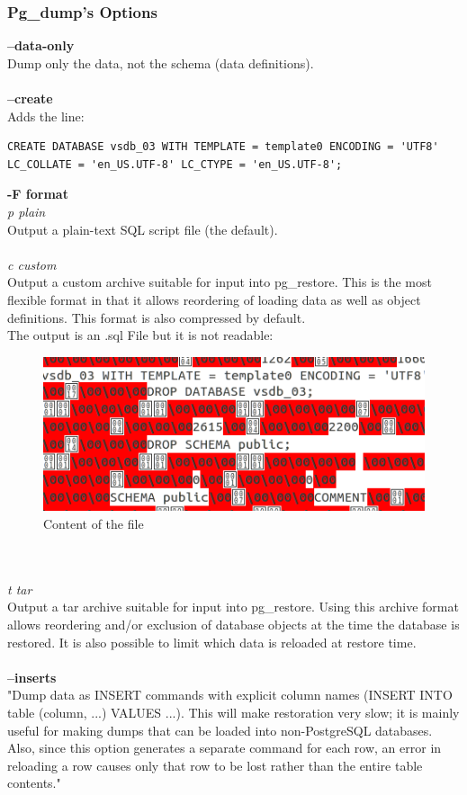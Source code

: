 \documentclass[10pt]{article}
\begin{document}
\subsubsection{Pg\_dump's Options}
\textbf{--data-only}\\
Dump only the data, not the schema (data definitions).
\\ \\
\textbf{--create}\\
Adds the line:
\begin{lstlisting}    
CREATE DATABASE vsdb_03 WITH TEMPLATE = template0 ENCODING = 'UTF8' LC_COLLATE = 'en_US.UTF-8' LC_CTYPE = 'en_US.UTF-8';
\end{lstlisting}    
\textbf{-F format}\\
\textit{p plain }\\
Output a plain-text SQL script file (the default).
\\ \\
\textit{c custom} \\
Output a custom archive suitable for input into pg\_restore. This is the most flexible format in that it allows reordering of loading data as well as object definitions. This format is also compressed by default. \\
The output is an .sql File but it is not readable:
\begin{figure}[!h]
	\begin{center}
		\includegraphics[width=0.5\linewidth]{pictures/content}
		\caption{Content of the file}
		\label{content}
	\end{center}
\end{figure} 
\\ \\
\textit{t tar} \\
Output a tar archive suitable for input into pg\_restore. Using this archive format allows reordering and/or exclusion of database objects at the time the database is restored. It is also possible to limit which data is reloaded at restore time.
\\ \\
\textbf{--inserts}\\
"Dump data as INSERT commands with explicit column names (INSERT INTO table (column, ...) VALUES ...). This will make restoration very slow; it is mainly useful for making dumps that can be loaded into non-PostgreSQL databases. Also, since this option generates a separate command for each row, an error in reloading a row causes only that row to be lost rather than the entire table contents." \cite{pgdumpdoc} \\
\end{document}
